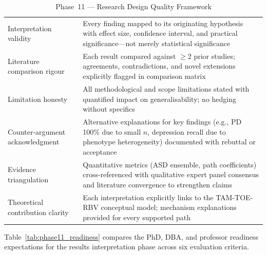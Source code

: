 \begingroup\singlespacing\tablefontsize\tablestripes
\begin{xltabular}{\textwidth}{@{} p{3.2cm} X @{}}
\caption{Phase~11 --- Research Design Quality Framework}
\label{tab:phase11_quality}\\
\toprule
{} &  \\
\midrule
\endfirsthead
\endhead
\bottomrule
\endlastfoot
Interpretation validity     & Every finding mapped to its originating hypothesis with effect size, confidence interval, and practical significance---not merely statistical significance \\
\addlinespace
Literature comparison rigour & Each result compared against $\geq$2 prior studies; agreements, contradictions, and novel extensions explicitly flagged in comparison matrix \\
\addlinespace
Limitation honesty           & All methodological and scope limitations stated with quantified impact on generalisability; no hedging without specifics \\
\addlinespace
Counter-argument acknowledgment & Alternative explanations for key findings (e.g., PD 100\% due to small $n$, depression recall due to phenotype heterogeneity) documented with rebuttal or acceptance \\
\addlinespace
Evidence triangulation       & Quantitative metrics (ASD ensemble, path coefficients) cross-referenced with qualitative expert panel consensus and literature convergence to strengthen claims \\
\addlinespace
Theoretical contribution clarity & Each interpretation explicitly links to the TAM-TOE-RBV conceptual model; mechanism explanations provided for every supported path \\
\end{xltabular}
\endgroup

\vspace{1.5em}

Table~\ref{tab:phase11_readiness} compares the PhD, DBA, and professor readiness expectations for the results interpretation phase across six evaluation criteria.

